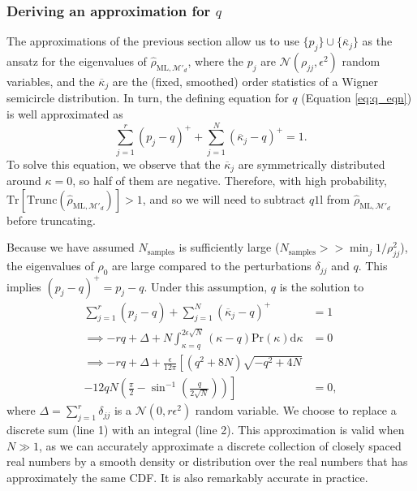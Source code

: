 \documentclass[aps,pra, twocolumn]{revtex4-1}
\newcommand{\M}{\mathcal{M}}
\newcommand{\Tr}{\mathrm{Tr}}
\newcommand{\Id}{\mathbb{I}}
\def\Id{1\!\mathrm{l}}
\newcommand{\rhohat}{\hat{\rho}}
\newcommand{\rhoML}[1]{\rhohat_{\scriptscriptstyle{\mathrm{ML},#1}}}
\begin{document}
\subsubsection{Deriving an approximation for $q$}
The approximations of the previous section allow us to use $\{p_j\} \cup \{\overline{\kappa}_j\}$ as the ansatz for the eigenvalues of $\rhoML{\M'_{d}}$, where the $p_j$ are $\mathcal{N}(\rho_{jj},\epsilon^2)$ random variables, and the $\overline{\kappa}_j$ are the (fixed, smoothed) order statistics of a Wigner semicircle distribution.  In turn, the defining equation for $q$ (Equation \eqref{eq:q_eqn}) is well approximated as
\begin{equation}
\nonumber \sum_{j=1}^{r}(p_j - q)^{+} + \sum_{j=1}^{N}{(\overline{\kappa}_j-q)^+} = 1.
\end{equation}
To solve this equation, we observe that the $\overline{\kappa}_j$ are symmetrically distributed around $
\kappa=0$, so half of them are negative.  Therefore, with high probability, $\Tr
\left[\mathrm{Trunc}(\rhoML{\M'_{d}})\right]>1$, and so we will need to subtract $q\Id$ from $\rhoML{\M'_{d}}$ before truncating.

Because we have assumed $N_{\mathrm{samples}}$ is sufficiently large ($N_{\mathrm{samples}} >> \min_{j}1/\rho_{jj}^{2}$), the eigenvalues of $\rho_{0}$ are large compared to the perturbations $\delta_{jj}$ and $q$. This implies $(p_{j} - q)^{+} = p_{j} - q$. Under this assumption, $q$ is the solution to
\begin{align}
\nonumber \sum_{j=1}^{r}(p_j - q) + \sum_{j=1}^{N}{(\overline{\kappa}_j-q)^+} & = 1\\
\nonumber \implies - rq + \Delta + N\int_{\kappa=q}^{2\epsilon\sqrt{N}}{(\kappa-q)\mathrm{Pr}(\kappa)\mathrm{d}\kappa} & = 0\\
\nonumber \label{eq:q_eqn2}\implies - rq + \Delta + \frac{\epsilon}{12\pi}\left[(q^2+8N)\sqrt{-q^2+4N} \right.\\
\left. -12qN\left(\frac{\pi}{2}-\sin^{-1}\left(\frac{q}{2\sqrt{N}}\right)\right)   \right]&=0,
\end{align}
where $\Delta = \sum_{j=1}^{r}\delta_{jj}$ is a $\mathcal{N}(0,r\epsilon^2)$ random variable.  We choose to replace a discrete 
sum (line 1) with an integral (line 2). This approximation is valid when $N\gg1$, as we can accurately approximate a discrete collection of closely spaced real numbers by a smooth density or distribution over the real numbers that has approximately the same CDF.  It is also remarkably accurate in practice.
  
\end{document}
